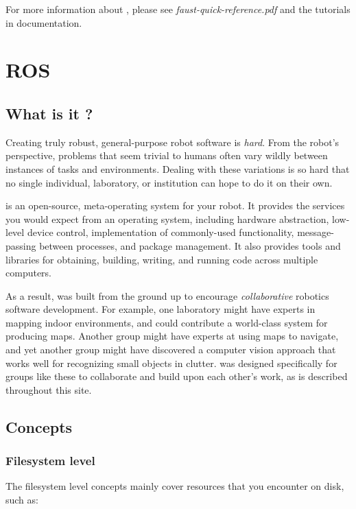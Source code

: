 For more information about \faust, please see \textit{faust-quick-reference.pdf} and the tutorials in \faust documentation.

\section{ROS}
\subsection{What is it ?}
 Creating truly robust, general-purpose robot software is \textit {hard}. From the robot's perspective, problems that seem trivial to humans often vary wildly between instances of tasks and environments. Dealing with these variations is so hard that no single individual, laboratory, or institution can hope to do it on their own. \newline

\ros is an open-source, meta-operating system for your robot. It provides the services you would expect from an operating system, including hardware abstraction, low-level device control, implementation of commonly-used functionality, message-passing between processes, and package management. It also provides tools and libraries for obtaining, building, writing, and running code across multiple computers. \newline

As a result, \ros was built from the ground up to encourage \textit{collaborative} robotics software development. For example, one laboratory might have experts in mapping indoor environments, and could contribute a world-class system for producing maps. Another group might have experts at using maps to navigate, and yet another group might have discovered a computer vision approach that works well for recognizing small objects in clutter. \ros was designed specifically for groups like these to collaborate and build upon each other's work, as is described throughout this site.\\

\subsection{Concepts}
\subsubsection{Filesystem level}
The filesystem level concepts mainly cover \ros resources that you encounter on disk, such as:

